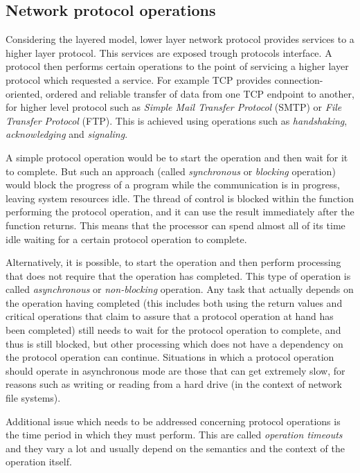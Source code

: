 \documentclass[times, utf8, diplomski]{fer}
\begin{document}
\subsection{Network protocol operations}
Considering the layered model, lower layer network protocol provides services to 
a higher layer protocol. This services are exposed trough protocols interface. 
A protocol then performs certain operations to the point of servicing a higher 
layer protocol which requested a service. For example TCP provides connection-oriented, 
ordered and reliable transfer of data from one TCP endpoint to another, for higher 
level protocol such as \emph{Simple Mail Transfer Protocol} (SMTP) or \emph{File 
Transfer Protocol} (FTP). This is achieved using operations such as \emph{handshaking}, 
\emph{acknowledging} and \emph{signaling}.

A simple protocol operation would be to start the operation and then wait for it 
to complete. But such an approach (called \emph{synchronous} or \emph{blocking} 
operation) would block the progress of a program while the communication is in
progress, leaving system resources idle. The thread of control is blocked within
the function performing the protocol operation, and it can use the result 
immediately after the function returns. This means that the processor can spend 
almost all of its time idle waiting for a certain protocol operation to complete.

Alternatively, it is possible, to start the operation and then perform processing 
that does not require that the operation has completed. This type of operation is 
called \emph{asynchronous} or \emph{non-blocking} operation. Any task that actually 
depends on the operation having completed (this includes both using the return 
values and critical operations that claim to assure that a protocol operation 
at hand has been completed) still needs to wait for the protocol operation to 
complete, and thus is still blocked, but other processing which does not have a 
dependency on the protocol operation can continue. Situations in which a protocol
operation should operate in asynchronous mode are those that can get extremely 
slow, for reasons such as writing or reading from a hard drive (in the context
of network file systems).

Additional issue which needs to be addressed concerning protocol operations is 
the time period in which they must perform. This are called \emph{operation 
timeouts} and they vary a lot and usually depend on the semantics and the 
context of the operation itself.
\end{document}
